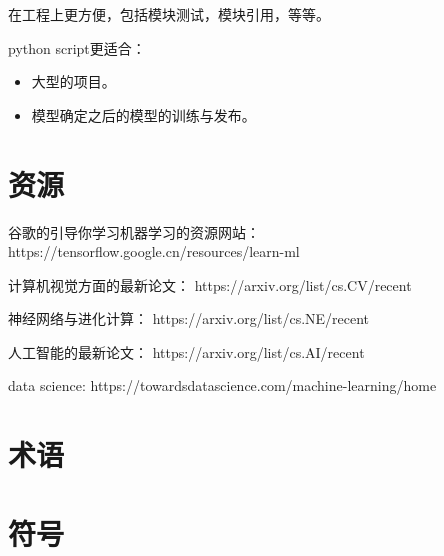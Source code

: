 \documentclass[a4paper,openright]{book}
\begin{document}
在工程上更方便，包括模块测试，模块引用，等等。

python script更适合：
\begin{itemize}
\item 大型的项目。
\item 模型确定之后的模型的训练与发布。
\end{itemize}

\chapter{资源}
谷歌的引导你学习机器学习的资源网站：
https://tensorflow.google.cn/resources/learn-ml

计算机视觉方面的最新论文：
https://arxiv.org/list/cs.CV/recent


神经网络与进化计算：
https://arxiv.org/list/cs.NE/recent


人工智能的最新论文：
https://arxiv.org/list/cs.AI/recent

data science:
https://towardsdatascience.com/machine-learning/home


\appendix{}
\cleardoublepage{}
\chapter{术语}
\chapter{符号}
\end{document}
